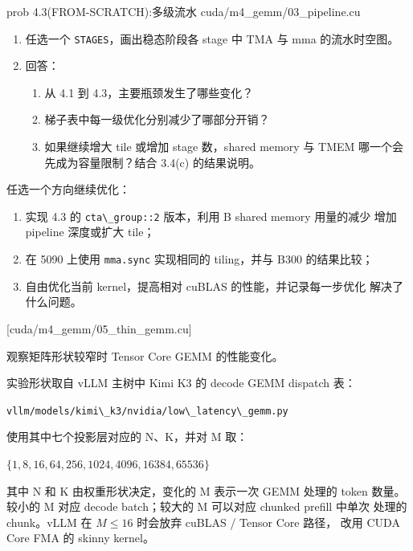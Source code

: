 \documentclass[11pt,a4paper,fontset=none]{ctexart}
\providecommand{\passthrough}[1]{#1}
\begin{document}
\begin{capstone}{prob 4.3(FROM-SCRATCH):多级流水 \hfill {\footnotesize\ttfamily cuda/m4\_gemm/03\_pipeline.cu}}
\begin{enumerate}
  比较两个形状对 \passthrough{\lstinline!STAGES!} 的敏感程度，并结合
  shared memory 用量、 每个 SM 可同时驻留的 block 数以及 block
  间并发能够隐藏的延迟进行解释。
\item
  任选一个 \passthrough{\lstinline!STAGES!}，画出稳态阶段各 stage 中 TMA
  与 mma 的流水时空图。
\item
  回答：

  \begin{enumerate}
  \def\labelenumii{(\alph{enumii})}
  \item
    从 4.1 到 4.3，主要瓶颈发生了哪些变化？
  \item
    梯子表中每一级优化分别减少了哪部分开销？
  \item
    如果继续增大 tile 或增加 stage 数，shared memory 与 TMEM
    哪一个会先成为容量限制？结合 3.4(c) 的结果说明。
  \end{enumerate}
\end{enumerate}

\end{capstone}


任选一个方向继续优化：

\begin{enumerate}
\def\labelenumi{(\alph{enumi})}
\item
  实现 4.3 的 \passthrough{\lstinline!cta\_group::2!} 版本，利用 B
  shared memory 用量的减少 增加 pipeline 深度或扩大 tile；
\item
  在 5090 上使用 \passthrough{\lstinline!mma.sync!} 实现相同的
  tiling，并与 B300 的结果比较；
\item
  自由优化当前 kernel，提高相对 cuBLAS 的性能，并记录每一步优化
  解决了什么问题。
\end{enumerate}

[cuda/m4\_gemm/05\_thin\_gemm.cu]

观察矩阵形状较窄时 Tensor Core GEMM 的性能变化。

实验形状取自 vLLM 主树中 Kimi K3 的 decode GEMM dispatch 表：

\passthrough{\lstinline!vllm/models/kimi\_k3/nvidia/low\_latency\_gemm.py!}

使用其中七个投影层对应的 N、K，并对 M 取：

\(\{1, 8, 16, 64, 256, 1024, 4096, 16384, 65536\}\)

其中 N 和 K 由权重形状决定，变化的 M 表示一次 GEMM 处理的 token 数量。
较小的 M 对应 decode batch；较大的 M 可以对应 chunked prefill 中单次
处理的 chunk。vLLM 在 \(M \le 16\) 时会放弃 cuBLAS / Tensor Core 路径，
改用 CUDA Core FMA 的 skinny kernel。
\end{document}
